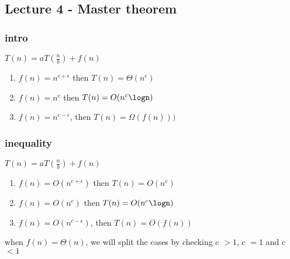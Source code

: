 \documentclass[../../main/main.tex]{subfiles}
\begin{document}
\subsection{Lecture 4 - Master theorem}

\subsubsection{intro}
$T(n) = aT(\frac{n}{b}) + f(n)$
\begin{enumerate}
  \item $f(n) = n^{c + \epsilon}$ then $T(n) = \Theta(n^c)$ 
  \item $f(n) = n^{c}$  then $T(n) = O(n^{c}\logn)$
  \item $f(n) = n^{c - \epsilon}$, then $T(n) = \Omega(f(n)))$
\end{enumerate}

\subsubsection{inequality}
$T(n) = aT(\frac{n}{b}) + f(n)$
\begin{enumerate}
  \item $f(n) = O(n^{c + \epsilon})$ then $T(n) = O(n^c)$ 
  \item $f(n) = O(n^{c})$  then $T(n) = O(n^{c}\logn)$
  \item $f(n) = O(n^{c - \epsilon})$, then $T(n) = O(f(n))$
\end{enumerate}

\begin{remark}
  when $f(n) = \Theta(n)$, we will split the cases by checking c $>1$, c $= 1$ and c $<1$
\end{remark}
\newline
\end{document}
